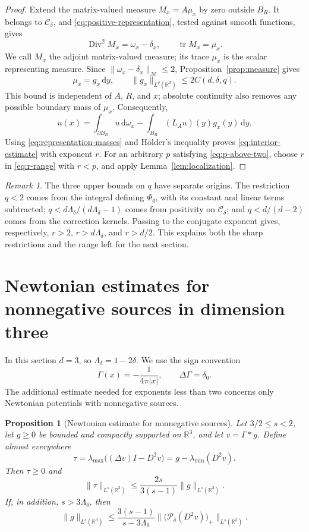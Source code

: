 \documentclass[11pt,a4paper,reqno]{amsart}
\theoremstyle{plain}
\newtheorem{proposition}[theorem]{Proposition}
\theoremstyle{remark}
\newtheorem{remark}[theorem]{Remark}
\numberwithin{equation}{section}
\newcommand{\R}{\mathbb R}
\newcommand{\Cdelta}{\mathcal C_\delta}
\newcommand{\Pdelta}{\mathcal P_\delta}
\newcommand{\lam}{\Lambda_\delta}
\newcommand{\dd}{\,\mathrm d}
\newcommand{\norm}[1]{\lVert#1\rVert}
\newcommand{\TV}[1]{\norm{#1}_{\mathcal M}}
\DeclareMathOperator{\tr}{tr}
\DeclareMathOperator{\Div}{Div}
\begin{document}
\begin{proof}
Extend the matrix-valued measure $M_x=A\mu_x$ by zero outside $\overline{B_R}$. It belongs to $\Cdelta$, and \eqref{eq:positive-representation}, tested against smooth functions, gives
\[
 \Div^2M_x=\omega_x-\delta_x,
 \qquad \tr M_x=\mu_x.
\]
We call $M_x$ the adjoint matrix-valued measure; its trace $\mu_x$ is the scalar representing measure.
Since $\TV{\omega_x-\delta_x}\le2$, Proposition~\ref{prop:measure} gives
\[
 \mu_x=g_x\dd y,\qquad
 \norm{g_x}_{L^q(\R^d)}\le2C(d,\delta,q).
\]
This bound is independent of $A$, $R$, and $x$; absolute continuity also removes any possible boundary mass of $\mu_x$. Consequently,
\[
 u(x)=\int_{\partial B_R}u\dd\omega_x
       -\int_{B_R}(L_Au)(y)g_x(y)\dd y.
\]
Using \eqref{eq:representation-masses} and H\"older's inequality proves \eqref{eq:interior-estimate} with exponent $r$. For an arbitrary $p$ satisfying \eqref{eq:p-above-two}, choose $r$ in \eqref{eq:r-range} with $r<p$, and apply Lemma~\ref{lem:localization}.
\end{proof}

\begin{remark}
The three upper bounds on $q$ have separate origins. The restriction $q<2$ comes from the integral defining $\Phi_q$, with its constant and linear terms subtracted; $q<d\lam/(d\lam-1)$ comes from positivity on $\Cdelta$; and $q<d/(d-2)$ comes from the correction kernels. Passing to the conjugate exponent gives, respectively, $r>2$, $r>d\lam$, and $r>d/2$. This explains both the sharp restrictions and the range left for the next section.
\end{remark}

\section{Newtonian estimates for nonnegative sources in dimension three}\label{sec:positive}
In this section $d=3$, so $\lam=1-2\delta$. We use the sign convention
\[
 \Gamma(x)=-\frac1{4\pi|x|},\qquad \Delta\Gamma=\delta_0.
\]
The additional estimate needed for exponents less than two concerns only Newtonian potentials with nonnegative sources.

\begin{proposition}[Newtonian estimate for nonnegative sources]\label{prop:source}
Let $3/2\le s<2$, let $g\ge0$ be bounded and compactly supported on $\R^3$, and let $v=\Gamma*g$. Define almost everywhere
\[
 \tau=\lambda_{\max}\bigl((\Delta v)I-D^2v\bigr)
      =g-\lambda_{\min}(D^2v).
\]
Then $\tau\ge0$ and
\begin{equation}\label{eq:source-norm}
 \norm{\tau}_{L^s(\R^3)}
 \le\frac{2s}{3(s-1)}\norm{g}_{L^s(\R^3)}.
\end{equation}
If, in addition, $s>3\lam$, then
\begin{equation}\label{eq:source-residual}
 \norm{g}_{L^s(\R^3)}
 \le\frac{3(s-1)}{s-3\lam}
       \norm{\bigl(\Pdelta(D^2v)\bigr)_+}_{L^s(\R^3)}.
\end{equation}
\end{proposition}
\end{document}
